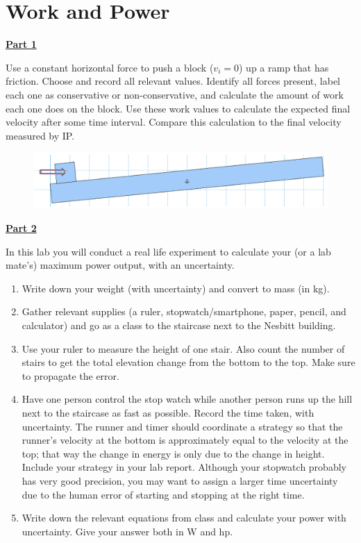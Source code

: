 \section{Work and Power}

\underline{\textbf{Part 1}} \par
Use a constant horizontal force to push a block ($v_i = 0$) up a ramp that has friction.
Choose and record all relevant values.
Identify all forces present, label each one as conservative or non-conservative, and calculate the amount of work each one does on the block.
Use these work values to calculate the expected final velocity after some time interval.
Compare this calculation to the final velocity measured by IP.

\begin{figure}[H]
\includegraphics[scale=0.50]{figures/workPower/fig1.png}
\end{figure}


\underline{\textbf{Part 2}} \par
In this lab you will conduct a real life experiment to calculate your (or a lab mate's) maximum power output, with an uncertainty.

\begin{enumerate}
\item Write down your weight (with uncertainty) and convert to mass (in kg).
\item Gather relevant supplies (a ruler, stopwatch/smartphone, paper, pencil, and calculator) and go as a class to the staircase next to the Nesbitt building.
\item Use your ruler to measure the height of one stair. Also count the number of stairs to get the total elevation change from the bottom to the top. Make sure to propagate the error.
\item Have one person control the stop watch while another person runs up the hill next to the staircase as fast as possible. Record the time taken, with uncertainty. The runner and timer should coordinate a strategy so that the runner's velocity at the bottom is approximately equal to the velocity at the top; that way the change in energy is only due to the change in height. Include your strategy in your lab report. Although your stopwatch probably has very good precision, you may want to assign a larger time uncertainty due to the human error of starting and stopping at the right time.
\item Write down the relevant equations from class and calculate your power with uncertainty. Give your answer both in W and hp.
\end{enumerate}

\pagebreak \clearpage
